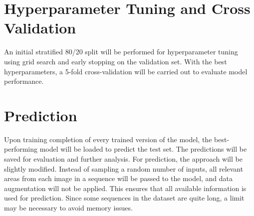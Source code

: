 \documentclass{article}
\begin{document}
\section*{Hyperparameter Tuning and Cross Validation} %

An initial stratified 80/20 split will be performed for hyperparameter tuning using grid search and early stopping
on the validation set. With the best hyperparameters, a 5-fold cross-validation will be carried out to
evaluate model performance.

\section*{Prediction} %

Upon training completion of every trained version of the model, the best-performing model will be loaded to predict 
the test set. The predictions will be saved for evaluation and further analysis.
For prediction, the approach will be slightly modified. Instead of sampling a random number of inputs, all relevant 
areas from each image in a sequence will be passed to the model, and data augmentation will not be applied.
This ensures that all available information is used for prediction. Since some sequences in the dataset
are quite long, a limit may be necessary to avoid memory issues.



\printbibliography
\end{document}
